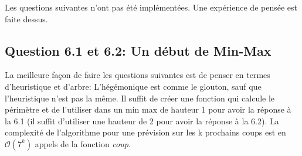 \documentclass[11pt]{article}
\begin{document}
    Les questions suivantes n'ont pas été implémentées. Une expérience de pensée est faite dessus.

    \subsection{Question 6.1 et 6.2: Un début de Min-Max}

    La meilleure façon de faire les questions suivantes est de penser en termes d'heuristique et d'arbre: L'hégémonique est comme le glouton, sauf que l'heuristique n'est pas la même. Il suffit de créer une fonction qui calcule le périmètre et de l'utiliser dans un min max de hauteur 1 pour avoir la réponse à la 6.1 (il suffit d'utiliser une hauteur de 2 pour avoir la réponse à la 6.2). La complexité de l'algorithme pour une prévision sur les k prochains coups est en $\mathcal{O}(7^k)$ appels de la fonction \textit{coup}. %
\end{document}
